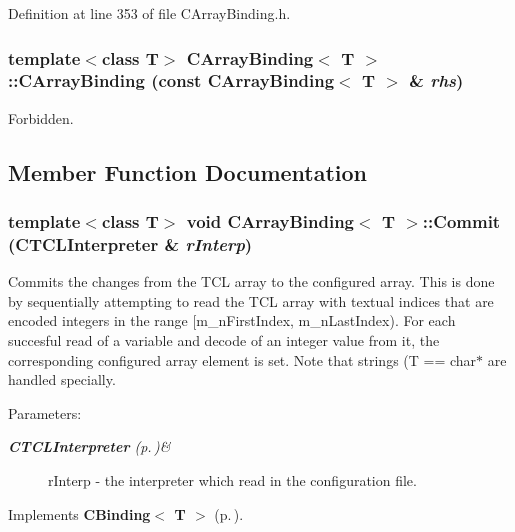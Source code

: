 Definition at line 353 of file CArray\-Binding.h.
\subsubsection{\setlength{\rightskip}{0pt plus 5cm}template$<$class T$>$ CArray\-Binding$<$ T $>$::CArray\-Binding (const CArray\-Binding$<$ T $>$ \& {\em rhs})\hspace{0.3cm}{\tt  [private]}}\label{classCArrayBinding_c0}


Forbidden.



\subsection{Member Function Documentation}
\subsubsection{\setlength{\rightskip}{0pt plus 5cm}template$<$class T$>$ void CArray\-Binding$<$ T $>$::Commit ({\bf CTCLInterpreter} \& {\em r\-Interp})\hspace{0.3cm}{\tt  [virtual]}}\label{classCArrayBinding_a11}


Commits the changes from the TCL array to the configured array. This is done by sequentially attempting to read the TCL array with textual indices that are encoded integers in the range [m\_\-n\-First\-Index, m\_\-n\-Last\-Index). For each succesful read of a variable and decode of an integer value from it, the corresponding configured array element is set. Note that strings (T == char$\ast$ are handled specially. \begin{Desc}
\item[Parameters: ]\par
\begin{description}
\item[{\em 
{\bf CTCLInterpreter} {\rm (p.\,\pageref{classCTCLInterpreter})}\&}]r\-Interp - the interpreter which read in the configuration file. \end{description}
\end{Desc}


Implements {\bf CBinding$<$ T $>$} {\rm (p.\,\pageref{classCBinding_a1})}.

